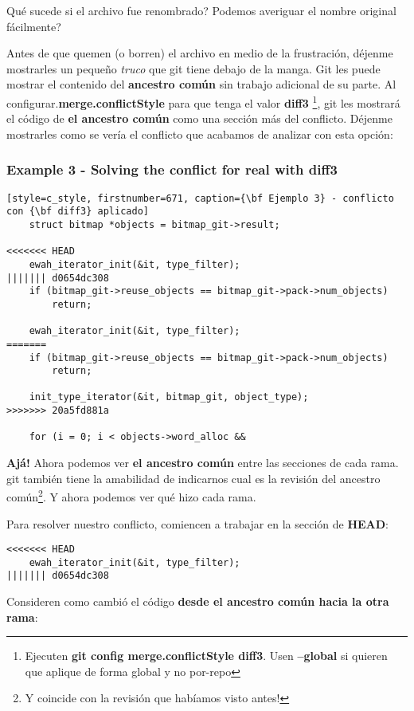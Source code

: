 Qué sucede si el archivo fue renombrado? Podemos averiguar el nombre original fácilmente?

Antes de que quemen (o borren) el archivo en medio de la frustración, déjenme mostrarles un pequeño {\it truco} que git tiene debajo de la
manga. Git les puede mostrar el contenido del {\bf ancestro común} sin trabajo adicional de su parte. Al configurar.{\bf merge.conflictStyle}
para que tenga el valor {\bf diff3} \footnote{ Ejecuten {\bf git config merge.conflictStyle diff3}. Usen {\bf --global} si
quieren que aplique de forma global y no por-repo}, git les mostrará el código de {\bf el ancestro común} como una sección
más del conflicto. Déjenme mostrarles como se vería el conflicto que acabamos de analizar con esta opción:

\subsubsection{Example 3 - Solving the conflict for real with {\bf diff3}}
\begin{lstlisting}[style=c_style, firstnumber=671, caption={\bf Ejemplo 3} - conflicto con {\bf diff3} aplicado]
	struct bitmap *objects = bitmap_git->result;

<<<<<<< HEAD
	ewah_iterator_init(&it, type_filter);
||||||| d0654dc308
	if (bitmap_git->reuse_objects == bitmap_git->pack->num_objects)
		return;

	ewah_iterator_init(&it, type_filter);
=======
	if (bitmap_git->reuse_objects == bitmap_git->pack->num_objects)
		return;

	init_type_iterator(&it, bitmap_git, object_type);
>>>>>>> 20a5fd881a

	for (i = 0; i < objects->word_alloc &&
\end{lstlisting}

{\bf Ajá!} Ahora podemos ver {\bf el ancestro común} entre las secciones de cada rama. git también tiene la amabilidad de
indicarnos cual es la revisión del ancestro común\footnote{Y coincide con la revisión que habíamos visto antes!}. Y ahora podemos ver
qué hizo cada rama.

Para resolver nuestro conflicto, comiencen a trabajar en la sección de {\bf HEAD}:
\begin{lstlisting}[style=c_style, firstnumber=673, caption={\bf Ejemplo 3} - paso 1]
<<<<<<< HEAD
	ewah_iterator_init(&it, type_filter);
||||||| d0654dc308
\end{lstlisting}

Consideren como cambió el código {\bf desde el ancestro común hacia la otra rama}:

